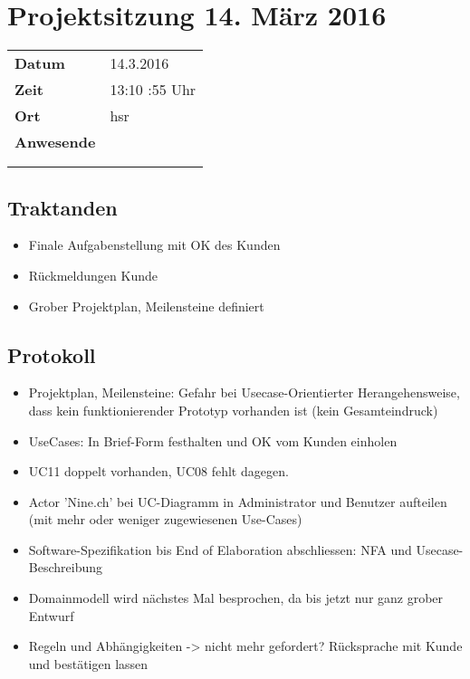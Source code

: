 \documentclass[class=scrbook,crop=false]{standalone}
\begin{document}
	
	\section*{Projektsitzung 14. März 2016}
	
	\begin{tabular}{ll}
		\textbf{Datum} & 14.3.2016 \\
		\textbf{Zeit} & 13:10 \textendash 13:55 Uhr \\
		\textbf{Ort} & \acs{hsr} \\
		\textbf{Anwesende} & \proff \\ & \ubos \\ & \pchr
	\end{tabular}
	
	\subsection*{Traktanden}
	
	\begin{itemize}
		\item Finale Aufgabenstellung mit OK des Kunden
        \item Rückmeldungen Kunde
        \item Grober Projektplan, Meilensteine definiert
	\end{itemize}
	
	\subsection*{Protokoll}
	
	\begin{itemize}
		\item Projektplan, Meilensteine: Gefahr bei Usecase-Orientierter Herangehensweise, dass kein funktionierender Prototyp vorhanden ist (kein Gesamteindruck)
		\item UseCases: In Brief-Form festhalten und OK vom Kunden einholen
		\item UC11 doppelt vorhanden, UC08 fehlt dagegen.
		\item Actor 'Nine.ch' bei UC-Diagramm in Administrator und Benutzer aufteilen (mit mehr oder weniger zugewiesenen Use-Cases)
		\item Software-Spezifikation bis End of Elaboration abschliessen: NFA und Usecase-Beschreibung
		\item Domainmodell wird nächstes Mal besprochen, da bis jetzt nur ganz grober Entwurf
		\item Regeln und Abhängigkeiten -> nicht mehr gefordert? Rücksprache mit Kunde und bestätigen lassen
	\end{itemize}
	
\end{document}
